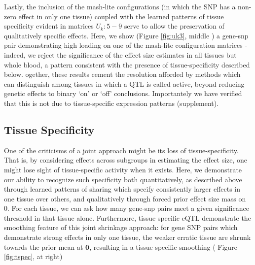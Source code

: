 Lastly, the inclusion of the mash-lite configurations (in which the SNP has a non-zero effect in only one tissue) coupled with the learned patterns of tissue specificity evident in matrices $U_{k}: 5-9$ serve to allow the preservation of qualitatively specific effects. Here, we show (Figure \ref{fig:uk3}, middle ) a gene-snp pair demonstrating high loading on one of the mash-lite configuration matrices - indeed, we reject the significance of the effect size estimates in all tissues but whole blood,  a pattern consistent with the presence of tissue-specificity described below. ogether, these results cement the resolution afforded by methods which can distinguish among tissues in which a QTL is called active, beyond reducing genetic effects to binary `on' or `off' conclusions. Importantely we have verified that this is not due to tissue-specific expression patterns (supplement). %


\subsection{Tissue Specificity}

One of the criticisms of a joint approach might be its loss of tissue-specificity. That is, by considering effects across subgroups in estimating the effect size, one might lose sight of tissue-specific activity when it exists. Here, we demonstrate our ability to recognize such specificity both quantitatively, as described above through learned patterns of sharing which specify consistently larger effects in one tissue over others, and qualitatively through forced prior effect size mass on 0.  For each tissue, we can ask how many gene-snp pairs meet a given significance threshold in that tissue alone. Furthermore, tissue specific eQTL demonstrate the smoothing feature of this joint shrinkage approach: for gene SNP pairs which demonstrate strong effects in only one tissue, the weaker erratic tissue are shrunk towards the prior mean at $\bm{0}$, resulting in a tissue specific smoothing ( Figure \ref{fig:tspec}, at right) \newline



